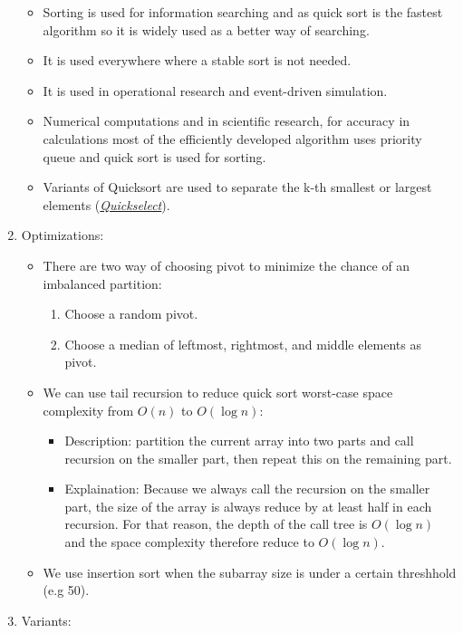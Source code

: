 \documentclass[12pt]{article}
\begin{document}
\begin{enumerate}
\begin{itemize}
            \item Sorting is used for information searching and as quick sort is the fastest algorithm so it is widely used as a better way of searching.
            \item It is used everywhere where a stable sort is not needed.
            \item It is used in operational research and event-driven simulation.
            \item Numerical computations and in scientific research, for accuracy in calculations most of the efficiently developed algorithm uses priority queue and quick sort is used for sorting.
            \item Variants of Quicksort are used to separate the k-th smallest or largest elements (\href{https://en.wikipedia.org/wiki/Quickselect}{\emph{Quickselect}}).
        \end{itemize}
        \item Optimizations:
        \begin{itemize}
            \item There are two way of choosing pivot to minimize the chance of an imbalanced partition:
            \begin{enumerate}
                \item Choose a random pivot.
                \item Choose a median of leftmost, rightmost, and middle elements as pivot.
            \end{enumerate}
            \item We can use tail recursion to reduce quick sort worst-case space complexity from $O(n)$ to $O(\log n)$:
            \begin{itemize}
                \item Description: partition the current array into two parts and call recursion on the smaller part, then repeat this on the remaining part.
                \item Explaination: Because we always call the recursion on the smaller part, the size of the array is always reduce by at least half in each recursion. For that reason, the depth of the call tree is $O(\log n)$ and the space complexity therefore reduce to $O(\log n)$.
            \end{itemize}
            \item We use insertion sort when the subarray size is under a certain threshhold (e.g 50).
        \end{itemize}
        \item Variants:

\end{enumerate}
\end{document}

